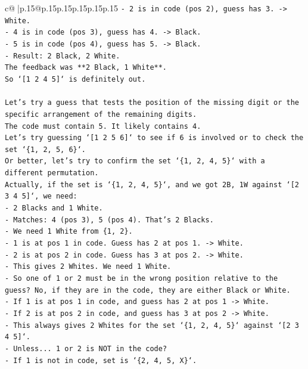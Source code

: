 \documentclass{article}
\begin{document}
{\begin{supertabular}{c@{$\;$}|p{.15\linewidth}@{}p{.15\linewidth}p{.15\linewidth}p{.15\linewidth}p{.15\linewidth}p{.15\linewidth}}
{{{\texttt{{-} 2 is in code (pos 2), guess has 3. {-}> White.} \\
\texttt{{-} 4 is in code (pos 3), guess has 4. {-}> Black.} \\
\texttt{{-} 5 is in code (pos 4), guess has 5. {-}> Black.} \\
\texttt{{-} Result: 2 Black, 2 White.} \\
\texttt{The feedback was **2 Black, 1 White**.} \\
\texttt{So `{[}1 2 4 5{]}` is definitely out.} \\
\\ 
\texttt{Let's try a guess that tests the position of the missing digit or the specific arrangement of the remaining digits.} \\
\texttt{The code must contain 5. It likely contains 4.} \\
\texttt{Let's try guessing `{[}1 2 5 6{]}` to see if 6 is involved or to check the set `\{1, 2, 5, 6\}`.} \\
\texttt{Or better, let's try to confirm the set `\{1, 2, 4, 5\}` with a different permutation.} \\
\texttt{Actually, if the set is `\{1, 2, 4, 5\}`, and we got 2B, 1W against `{[}2 3 4 5{]}`, we need:} \\
\texttt{{-} 2 Blacks and 1 White.} \\
\texttt{{-} Matches: 4 (pos 3), 5 (pos 4). That's 2 Blacks.} \\
\texttt{{-} We need 1 White from \{1, 2\}.} \\
\texttt{{-} 1 is at pos 1 in code. Guess has 2 at pos 1. {-}> White.} \\
\texttt{{-} 2 is at pos 2 in code. Guess has 3 at pos 2. {-}> White.} \\
\texttt{{-} This gives 2 Whites. We need 1 White.} \\
\texttt{{-} So one of 1 or 2 must be in the wrong position relative to the guess? No, if they are in the code, they are either Black or White.} \\
\texttt{{-} If 1 is at pos 1 in code, and guess has 2 at pos 1 {-}> White.} \\
\texttt{{-} If 2 is at pos 2 in code, and guess has 3 at pos 2 {-}> White.} \\
\texttt{{-} This always gives 2 Whites for the set `\{1, 2, 4, 5\}` against `{[}2 3 4 5{]}`.} \\
\texttt{{-} Unless... 1 or 2 is NOT in the code?} \\
\texttt{{-} If 1 is not in code, set is `\{2, 4, 5, X\}`.} \\
}}}
\end{supertabular}}
\end{document}
